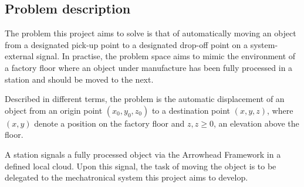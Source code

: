 \subsection{Problem description}
The problem this project aims to solve is that of automatically moving an object from a designated pick-up point to a designated drop-off point on a system-external signal.
In practise, the problem space aims to mimic the environment of a factory floor where an object under manufacture has been fully processed in a station and should be moved to the next.

Described in different terms, the problem is the automatic displacement of an object from an origin point $(x_0, y_0, z_0)$ to a destination point $(x, y, z)$,
where $(x, y)$ denote a position on the factory floor and $z, z \geq 0$, an elevation above the floor.

A station signals a fully processed object via the Arrowhead Framework in a defined local cloud.
Upon this signal, the task of moving the object is to be delegated to the mechatronical system this project aims to develop.

